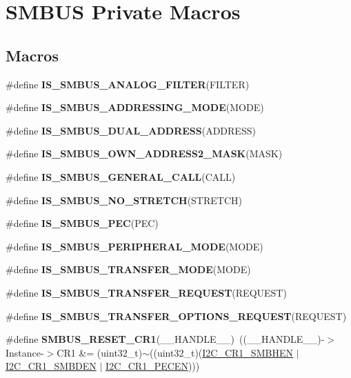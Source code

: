 \hypertarget{group___s_m_b_u_s___private___macro}{}\section{S\+M\+B\+US Private Macros}
\label{group___s_m_b_u_s___private___macro}
\subsection*{Macros}
\begin{DoxyCompactItemize}
\item 
\#define {\bfseries I\+S\+\_\+\+S\+M\+B\+U\+S\+\_\+\+A\+N\+A\+L\+O\+G\+\_\+\+F\+I\+L\+T\+ER}(F\+I\+L\+T\+ER)
\item 
\#define {\bfseries I\+S\+\_\+\+S\+M\+B\+U\+S\+\_\+\+A\+D\+D\+R\+E\+S\+S\+I\+N\+G\+\_\+\+M\+O\+DE}(M\+O\+DE)
\item 
\#define {\bfseries I\+S\+\_\+\+S\+M\+B\+U\+S\+\_\+\+D\+U\+A\+L\+\_\+\+A\+D\+D\+R\+E\+SS}(A\+D\+D\+R\+E\+SS)
\item 
\#define {\bfseries I\+S\+\_\+\+S\+M\+B\+U\+S\+\_\+\+O\+W\+N\+\_\+\+A\+D\+D\+R\+E\+S\+S2\+\_\+\+M\+A\+SK}(M\+A\+SK)
\item 
\#define {\bfseries I\+S\+\_\+\+S\+M\+B\+U\+S\+\_\+\+G\+E\+N\+E\+R\+A\+L\+\_\+\+C\+A\+LL}(C\+A\+LL)
\item 
\#define {\bfseries I\+S\+\_\+\+S\+M\+B\+U\+S\+\_\+\+N\+O\+\_\+\+S\+T\+R\+E\+T\+CH}(S\+T\+R\+E\+T\+CH)
\item 
\#define {\bfseries I\+S\+\_\+\+S\+M\+B\+U\+S\+\_\+\+P\+EC}(P\+EC)
\item 
\#define {\bfseries I\+S\+\_\+\+S\+M\+B\+U\+S\+\_\+\+P\+E\+R\+I\+P\+H\+E\+R\+A\+L\+\_\+\+M\+O\+DE}(M\+O\+DE)
\item 
\#define {\bfseries I\+S\+\_\+\+S\+M\+B\+U\+S\+\_\+\+T\+R\+A\+N\+S\+F\+E\+R\+\_\+\+M\+O\+DE}(M\+O\+DE)
\item 
\#define {\bfseries I\+S\+\_\+\+S\+M\+B\+U\+S\+\_\+\+T\+R\+A\+N\+S\+F\+E\+R\+\_\+\+R\+E\+Q\+U\+E\+ST}(R\+E\+Q\+U\+E\+ST)
\item 
\#define {\bfseries I\+S\+\_\+\+S\+M\+B\+U\+S\+\_\+\+T\+R\+A\+N\+S\+F\+E\+R\+\_\+\+O\+P\+T\+I\+O\+N\+S\+\_\+\+R\+E\+Q\+U\+E\+ST}(R\+E\+Q\+U\+E\+ST)
\item 
\mbox{\label{group___s_m_b_u_s___private___macro_ga9e6d8b9744c2937be20c71ec689bf957}} 
\#define {\bfseries S\+M\+B\+U\+S\+\_\+\+R\+E\+S\+E\+T\+\_\+\+C\+R1}(\+\_\+\+\_\+\+H\+A\+N\+D\+L\+E\+\_\+\+\_\+)~((\+\_\+\+\_\+\+H\+A\+N\+D\+L\+E\+\_\+\+\_\+)-\/$>$Instance-\/$>$C\+R1 \&= (uint32\+\_\+t)$\sim$((uint32\+\_\+t)(\hyperlink{group___peripheral___registers___bits___definition_gaca44767df3368d7f0a9a17c20c55d27b}{I2\+C\+\_\+\+C\+R1\+\_\+\+S\+M\+B\+H\+EN} $\vert$ \hyperlink{group___peripheral___registers___bits___definition_ga656e66b079528ed6d5c282010e51a263}{I2\+C\+\_\+\+C\+R1\+\_\+\+S\+M\+B\+D\+EN} $\vert$ \hyperlink{group___peripheral___registers___bits___definition_ga393649f17391feae45fa0db955b3fdf5}{I2\+C\+\_\+\+C\+R1\+\_\+\+P\+E\+C\+EN})))

\end{DoxyCompactItemize}
